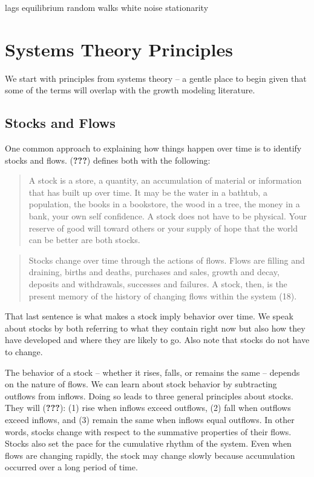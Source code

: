 \documentclass[english,,man]{apa6}
\theoremstyle{definition}
\theoremstyle{definition}
\theoremstyle{definition}
\theoremstyle{remark}
\begin{document}
lags equilibrium random walks white noise stationarity

\hypertarget{systems-theory-principles}{%
\section{Systems Theory Principles}\label{systems-theory-principles}}

We start with principles from systems theory -- a gentle place to begin
given that some of the terms will overlap with the growth modeling
literature.

\hypertarget{stocks-and-flows}{%
\subsection{Stocks and Flows}\label{stocks-and-flows}}

One common approach to explaining how things happen over time is to
identify stocks and flows. ({\textbf{???}}) defines both with the
following:

\begin{quote}
A stock is a store, a quantity, an accumulation of material or
information that has built up over time. It may be the water in a
bathtub, a population, the books in a bookstore, the wood in a tree, the
money in a bank, your own self confidence. A stock does not have to be
physical. Your reserve of good will toward others or your supply of hope
that the world can be better are both stocks.
\end{quote}

\begin{quote}
Stocks change over time through the actions of flows. Flows are filling
and draining, births and deaths, purchases and sales, growth and decay,
deposits and withdrawals, successes and failures. A stock, then, is the
present memory of the history of changing flows within the system (18).
\end{quote}

\noindent That last sentence is what makes a stock imply behavior over
time. We speak about stocks by both referring to what they contain right
now but also how they have developed and where they are likely to go.
Also note that stocks do not have to change.

The behavior of a stock -- whether it rises, falls, or remains the same
-- depends on the nature of flows. We can learn about stock behavior by
subtracting outflows from inflows. Doing so leads to three general
principles about stocks. They will ({\textbf{???}}): (1) rise when
inflows exceed outflows, (2) fall when outflows exceed inflows, and (3)
remain the same when inflows equal outflows. In other words, stocks
change with respect to the summative properties of their flows. Stocks
also set the pace for the cumulative rhythm of the system. Even when
flows are changing rapidly, the stock may change slowly because
accumulation occurred over a long period of time.
\end{document}
